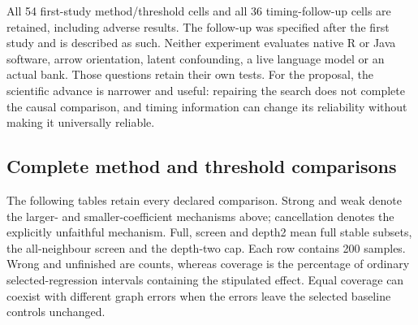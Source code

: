 All 54 first-study method/threshold cells and all 36 timing-follow-up cells
are retained, including adverse results. The follow-up was specified after
the first study and is described as such. Neither experiment evaluates native
R or Java software, arrow orientation, latent confounding, a live language
model or an actual bank. Those questions retain their own tests. For the
proposal, the scientific advance is narrower and useful: repairing the search
does not complete the causal comparison, and timing information can change
its reliability without making it universally reliable.

\subsection{Complete method and threshold comparisons}

The following tables retain every declared comparison. Strong and weak denote
the larger- and smaller-coefficient mechanisms above; cancellation denotes
the explicitly unfaithful mechanism. Full, screen and depth2 mean full stable
subsets, the all-neighbour screen and the depth-two cap. Each row contains
200 samples. Wrong and unfinished are counts, whereas coverage is the
percentage of ordinary selected-regression intervals containing the stipulated
effect. Equal coverage can coexist with different graph errors when the
errors leave the selected baseline controls unchanged.


